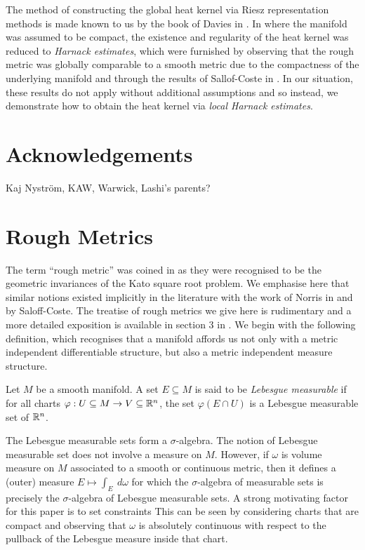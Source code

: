\documentclass[a4paper, 12pt]{amsart}
\newcommand{\Bk}{\color{black}}
\newcommand{\Rd}{\color{red}}
\begin{document}
The method of constructing the global heat kernel
via Riesz representation methods is made known to us by
the book of Davies in \cite{Davies}.
In \cite{BCont} where the manifold was assumed to be compact, 
the existence and regularity of the heat kernel was
reduced to \emph{Harnack estimates}, which were
furnished by observing that  
the rough metric was globally comparable to a smooth metric
due to the compactness of the underlying manifold and
through the  results of Sallof-Coste in \cite{SC}.
In our situation, these results do not apply without additional assumptions
and so instead, we demonstrate
how to obtain the heat kernel via \emph{local Harnack estimates}. 

\section*{Acknowledgements}

Kaj Nyström, KAW, Warwick, Lashi's parents? 

\section{Rough Metrics}
\label{sec:rough_metrics}

The term ``rough metric'' was coined in \cite{BRough} as they were 
recognised to be the geometric invariances of the Kato square root problem.
We emphasise here that similar notions existed implicitly in the 
literature with the work of Norris in \cite{Norris} 
and \cite{SC} by Saloff-Coste.
The treatise of rough metrics we give here is rudimentary and 
a more detailed exposition is available in section 3 in \cite{BRough}. 
We begin with the following definition, which recognises
that a manifold affords us not only with a metric independent 
differentiable structure, but also a metric independent measure
structure.

\begin{defn}
Let \(M\) be a smooth manifold. A set \(E \subseteq M\) is said to be \emph{Lebesgue measurable} if for all charts \(\varphi : U \subseteq M \to V \subseteq \mathbb{R}^n\), the set \(\varphi(E \cap U)\) is a Lebesgue measurable set of \(\mathbb{R}^n\).
\end{defn}

\begin{rem}
The Lebesgue measurable sets form a \(\sigma\)-algebra. The notion of Lebesgue measurable set does not involve a measure on \(M\). 
However, if \(\omega\) is volume \Rd measure \Bk on \(M\) associated to a smooth or continuous metric, then it defines a (outer) measure \(E \mapsto \int_E\ d\omega\) for which the \(\sigma\)-algebra of measurable sets is precisely the \(\sigma\)-algebra of Lebesgue measurable sets.
A strong motivating factor for this paper is to set
constraints 
\Rd This can be seen by considering charts that are compact and observing that \(\omega\) is absolutely continuous with respect to the pullback of the Lebesgue measure inside that chart. \Bk
\end{rem}
\end{document}
